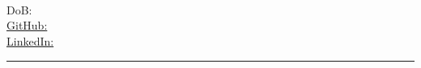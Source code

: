\begin{center}
	\begin{minipage}[b]{.3\textwidth}
	\raggedright
	{\large \phone} \\ %
	{\city} \\ %
	\href{mailto:\email}{\email} %
	\end{minipage}%
	\begin{minipage}[b]{.4\textwidth}
	\makeatletter
	\centering {\HUGE \@author} \\
	\makeatother
    \vspace{.5em}
    {\color{highlight} \Large{\role}}
	\end{minipage}%
	\begin{minipage}[b]{.3\textwidth}
	\raggedleft 
	{DoB: \dob} \\ %
	\href{https://github.com/\github}{GitHub: \github} \\%
	\href{https://www.linkedin.com/in/\LinkedIn}{LinkedIn: \LinkedIn} %
	\end{minipage}

{\color{highlight} \hrule}
\end{center}